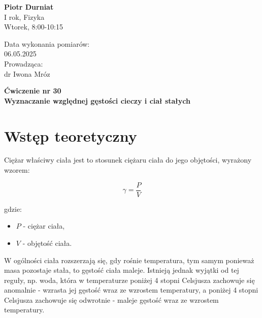 \documentclass[a4paper,12pt]{article}
\begin{document}
\noindent
\begin{minipage}{0.5\textwidth}
    \raggedright
    \textbf{Piotr Durniat} \\
    I rok, Fizyka \\
    Wtorek, 8:00-10:15 \\
    \vspace{0.5cm}
    \vspace{0.5cm}
\end{minipage}%
\begin{minipage}{0.5\textwidth}
    \raggedleft
    Data wykonania pomiarów: \\
    06.05.2025 \\
    \vspace{0.5cm} %
    Prowadząca: \\
    dr Iwona Mróz
\end{minipage}

\vspace{2cm} %
\begin{center}
    \LARGE \textbf{Ćwiczenie nr 30} \\[0.5cm]
    \Large \textbf{Wyznaczanie względnej gęstości cieczy i ciał stałych}
\end{center}

\vspace{1cm} %
\noindent

\tableofcontents
\newpage

\section{Wstęp teoretyczny}

Ciężar właściwy ciała jest to stosunek ciężaru ciała do jego objętości, wyrażony wzorem:

\begin{equation*}
    \gamma = \frac{P}{V}
\end{equation*}

gdzie:
\begin{itemize}
    \setlength{\itemsep}{0em}
    \item $P$ - ciężar ciała,
    \item $V$ - objętość ciała.
\end{itemize}

W ogólności ciała rozszerzają się, gdy rośnie temperatura, tym samym ponieważ masa pozostaje stała, to gęstość ciała maleje. Istnieją jednak wyjątki od tej reguły, np. woda, która w temperaturze poniżej 4 stopni Celsjusza zachowuje się anomalnie - wzrasta jej gęstość wraz ze wzrostem temperatury, a poniżej 4 stopni Celsjusza zachowuje się odwrotnie - maleje gęstość wraz ze wzrostem temperatury.
\end{document}
